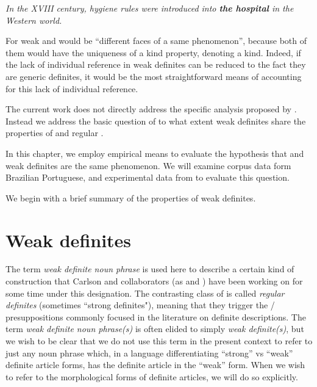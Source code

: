 \documentclass[output=paper,
modfonts
]{langscibook}
\begin{document}
\ea \label{ex:desaetal:3}
\textit{In the XVIII century, hygiene rules were introduced into \textbf{the hospital} in the Western world.}
\z 

For \citet[193]{Aguilar-GuevaraZwarsts2011} weak and  would be “different faces of a same phenomenon”, because both of them would have the uniqueness of a kind property, denoting a kind.  Indeed, if the lack of individual reference in weak definites can be reduced to the fact they are generic definites, it would be the most straightforward means of accounting for this lack of individual reference. 

The current work does not directly address the specific analysis proposed by \citet{Aguilar-GuevaraZwarsts2011}. Instead we address the basic question of to what extent weak definites share the properties of  and regular .
 
In this chapter, we employ empirical means to evaluate the hypothesis that  and weak definites are the same phenomenon. We will examine corpus data form Brazilian Portuguese, and experimental data from  to evaluate this question.

We begin with a brief summary of the properties of weak definites.


\section{Weak definites} \label{sec:desaetal:2}

The term \textit{weak definite noun phrase} is used here to describe a certain kind of construction that Carlson and collaborators (as \citealt{CarlsonSussman2005,CarlsonEtAlii2006,CarlsonEtAlii2013} and \citealt{KleinEtAlii2013})
have been working on for some time under this designation. The contrasting class of  is called \textit{regular definites} (sometimes “strong definites"), meaning that they trigger the / presuppositions commonly focused in the literature on definite descriptions. The term \textit{weak definite noun phrase(s)} is often elided to simply \textit{weak definite(s)}, but we wish to be clear that we do not use this term in the present context to refer to just any noun phrase which, in a language differentiating “strong” vs “weak” definite article forms, has the definite article in the “weak” form.  When we wish to refer to the morphological forms of definite articles, we will do so explicitly.
\end{document}
